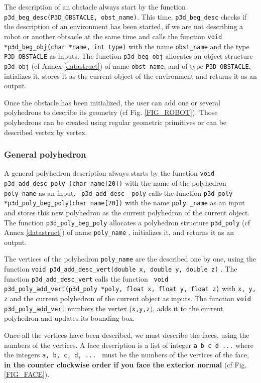 The description of an obstacle always start by the function {\tt
p3d\_beg\_desc(P3D\_OBSTACLE, obst\_name)}. This time, {\tt p3d\_beg\_desc}
checks if the description of an environment has been started, if we
are not describing a robot or another obtsacle at the same time and
calls the function {\tt void *p3d\_beg\_obj(char *name, int type)} 
with the name {\tt obst\_name} and the type {\tt P3D\_OBSTACLE} as inputs. 
The function {\tt p3d\_beg\_obj} allocates an object structure {\tt
p3d\_obj} (cf Annex \ref{datastruct}) of name {\tt obst\_name}, and
of type {\tt P3D\_OBSTACLE}, intializes it, stores it as the current
object of the environment and returns it as an output.

Once the obstacle has been initialized, the user can add one or several
polyhedrons to describe its geometry (cf Fig. \ref{FIG_ROBOT}). Those
polyhedrons can be created using regular geometric primitives or can
be described vertex by vertex.

\subsubsection{General polyhedron}

A general polyhedron description always starts by the function {\tt void
p3d\_add\_desc\_poly (char name[20])} 
with the name of the polyhedron {\tt poly\_name} as an input. {\tt
p3d\_add\_desc \_poly} calls the function
{\tt p3d\_poly *p3d\_poly\_beg\_poly(char name[20])}
 with the name {\tt poly \_name}  as an
input and stores this new polyhedron as the current polyhedron of the
current object. The function {\tt p3d\_poly\_beg\_poly} allocates a
polyhedron  structure {\tt p3d\_poly} (cf Annex \ref{datastruct}) of
name {\tt poly\_name} , initializes it, and returns it as an output.

The vertices of the polyhedron {\tt poly\_name} are the described one by one,
using the function {\tt void p3d\_add\_desc\_vert(double x, double y, double
z)} . The function {\tt p3d\_add\_desc\_vert} calls the function {\tt
void p3d\_poly\_add\_vert(p3d\_poly *poly, float x, float y, float z)}
with {\tt x, y, z} and the current polyhedron of the current object as
inputs. The function {\tt void p3d\_poly\_add\_vert} numbers the
vertex ({\tt x,y,z}), adds it to the current polyhedron and updates
its bounding box.

Once all the vertices have been described, we must describe the faces,
using the numbers of the vertices. A face description is a list of
integer {\tt a b c d ...} where the integers {\tt a,
b, c, d, ... } must be the numbers of the vertices of the face,
{\bf in the counter clockwise order if you face the exterior normal}
(cf Fig. \ref{FIG_FACE}).


